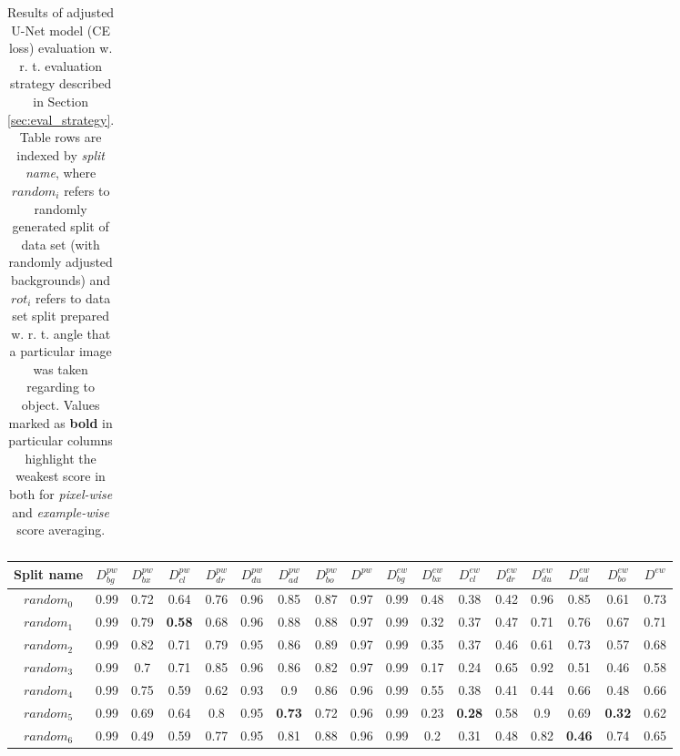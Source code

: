 \documentclass{article}
\begin{document}
\begin{center}
\begin{table}[H]
\begin{tabular}{ |c|c|c|c|c|c|c|c|c||c|c|c|c|c|c|c|c| }
\end{tabular} 
\caption{Results of adjusted U-Net \cite{unet} model (CE loss) evaluation w. r. t. evaluation strategy described in Section \ref{sec:eval_strategy}. Table rows are indexed by \textit{split name}, where $random_i$ refers to randomly generated split of data set (with randomly adjusted backgrounds) and $rot_i$ refers to data set split prepared w. r. t. angle that a particular image was taken regarding to object. Values marked as \textbf{bold} in particular columns highlight the weakest score in both for \textit{pixel-wise} and \textit{example-wise} score averaging.}
\label{tab:unet_ce_results}
\end{table}
\end{center}

\begin{center}
\begin{table}[H]
\tiny \renewcommand{\arraystretch}{1.5} \begin{tabular}{ |c|c|c|c|c|c|c|c|c||c|c|c|c|c|c|c|c| } \hline Split name & $D^{pw}_{bg}$ & $D^{pw}_{bx}$ & $D^{pw}_{cl}$ & $D^{pw}_{dr}$ & $D^{pw}_{du}$ & $D^{pw}_{ad}$ & $D^{pw}_{bo}$ & $D^{pw}$ &  $D^{ew}_{bg}$ & $D^{ew}_{bx}$ & $D^{ew}_{cl}$ & $D^{ew}_{dr}$ & $D^{ew}_{du}$ & $D^{ew}_{ad}$ & $D^{ew}_{bo}$ & $D^{ew}$ \\ [1.05ex] \hline 
$random_0$ &  0.99 & 0.72 & 0.64 & 0.76 & 0.96 & 0.85 & 0.87 & 0.97 &  0.99 & 0.48 & 0.38 & 0.42 & 0.96 & 0.85 & 0.61 & 0.73 \\ \hline 
$random_1$ &  0.99 & 0.79 & \textbf{0.58} & 0.68 & 0.96 & 0.88 & 0.88 & 0.97 &  0.99 & 0.32 & 0.37 & 0.47 & 0.71 & 0.76 & 0.67 & 0.71 \\ \hline 
$random_2$ &  0.99 & 0.82 & 0.71 & 0.79 & 0.95 & 0.86 & 0.89 & 0.97 &  0.99 & 0.35 & 0.37 & 0.46 & 0.61 & 0.73 & 0.57 & 0.68 \\ \hline 
$random_3$ &  0.99 & 0.7 & 0.71 & 0.85 & 0.96 & 0.86 & 0.82 & 0.97 &  0.99 & 0.17 & 0.24 & 0.65 & 0.92 & 0.51 & 0.46 & 0.58 \\ \hline 
$random_4$ &  0.99 & 0.75 & 0.59 & 0.62 & 0.93 & 0.9 & 0.86 & 0.96 &  0.99 & 0.55 & 0.38 & 0.41 & 0.44 & 0.66 & 0.48 & 0.66 \\ \hline 
$random_5$ &  0.99 & 0.69 & 0.64 & 0.8 & 0.95 & \textbf{0.73} & 0.72 & 0.96 &  0.99 & 0.23 & \textbf{0.28} & 0.58 & 0.9 & 0.69 & \textbf{0.32} & 0.62 \\ \hline 
$random_6$ &  0.99 & 0.49 & 0.59 & 0.77 & 0.95 & 0.81 & 0.88 & 0.96 &  0.99 & 0.2 & 0.31 & 0.48 & 0.82 & \textbf{0.46} & 0.74 & 0.65 \\ \hline 

\end{tabular}
\end{table}
\end{center}
\end{document}
